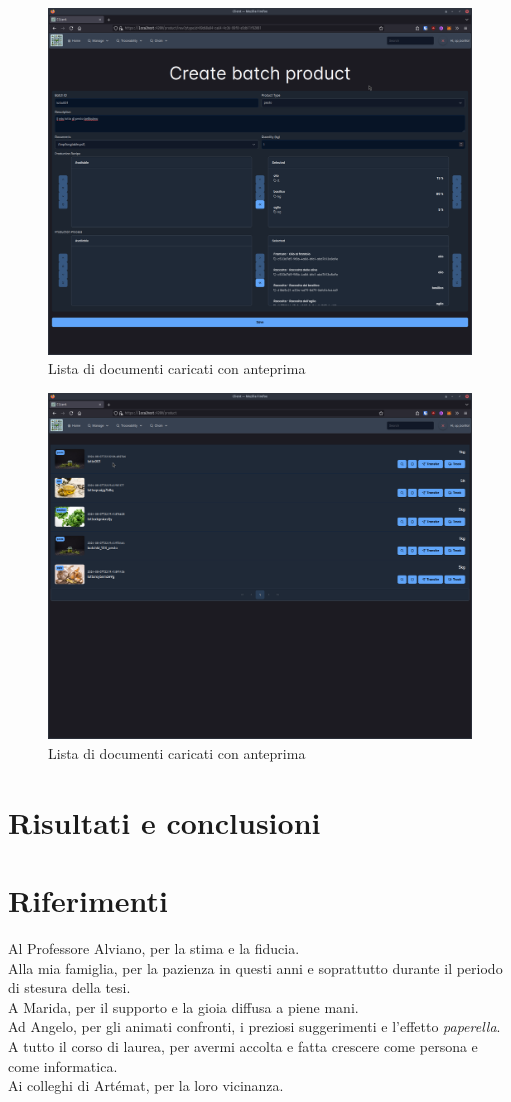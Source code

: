 \documentclass[a4paper,11pt]{article}
\begin{document}
\begin{figure}[H]
  \centering
  \includegraphics[width=0.5\linewidth]{screenIotChain/0012.png}
  \caption{Lista di documenti caricati con anteprima}
  \label{fig:screen12}
\end{figure}


\begin{figure}[H]
  \centering
  \includegraphics[width=0.5\linewidth]{screenIotChain/0013.png}
  \caption{Lista di documenti caricati con anteprima}
  \label{fig:screen13}
\end{figure}



\clearpage
\section{Risultati e conclusioni}

\clearpage
\section{Riferimenti}
\listoffigures
\clearpage
\listoftables
\clearpage
\renewcommand\listoflistingscaption{Elenco del codice sorgente}
\listoflistings %
\clearpage
\printbibliography
\clearpage
{}
\centering
\vspace*{\fill}
Al Professore Alviano, per la stima e la fiducia.
\\
Alla mia famiglia, per la pazienza in questi anni e soprattutto durante il periodo di stesura della tesi.
\\
A Marida, per il supporto e la gioia diffusa a piene mani.
\\
Ad Angelo, per gli animati confronti, i preziosi suggerimenti e l’effetto \textit{paperella}.
\\
A tutto il corso di laurea, per avermi accolta e fatta crescere come persona e come informatica.
\\
Ai colleghi di Artémat, per la loro vicinanza.
\vspace*{\fill}
\end{document}
